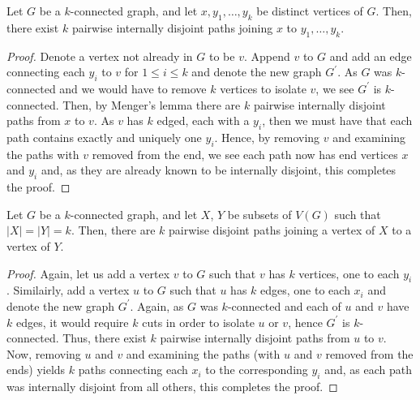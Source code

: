 \begin{lemma}
	Let $G$ be a $k$-connected graph, and let $x, y_1, \ldots, y_{k}$ be distinct vertices of $G$. Then, there exist $k$ pairwise internally disjoint paths joining $x$ to $y_1, \ldots, y_{k}$.
\end{lemma}
\begin{proof}
	Denote a vertex not already in $G$ to be $v$. Append  $v$ to $G$ and add an edge connecting each $ y_{i}$ to $v$ for $1 \le i \le k$ and denote the new graph $ G^{\prime}$. As $G$ was $k$-connected and we would have to remove $k$ vertices to isolate $v$, we see $G^{\prime}$ is $k$-connected. Then, by Menger's lemma there are $k$ pairwise internally disjoint paths from $x$ to $v$. As $v$ has $k$ edged, each with a $ y_{i}$, then we must have that each path contains exactly and uniquely one $ y_{i}$. Hence, by removing $v$ and examining the paths with $v$ removed from the end, we see each path now has end vertices $x$ and $ y_{i}$ and, as they are already known to be internally disjoint, this completes the proof.
\end{proof}
\begin{lemma}
	Let $G$ be a $k$-connected graph, and let $X$, $Y$ be subsets of $V\left( G \right) $ such that $\left| X \right| = \left| Y \right| = k$. Then, there are $k$ pairwise disjoint paths joining a vertex of $X$ to a vertex of $Y$.
\end{lemma}
\begin{proof}
	Again, let us add a vertex $v$ to $G$ such that $v$ has $k$ vertices, one to each $ y_{i}$. Similairly, add a vertex $u$ to $G$ such that $u$ has $k$ edges, one to each $x_{i}$ and denote the new graph $G^{\prime}$. Again, as $G$ was $k$-connected and each of $u$ and $v$ have $k$ edges, it would require $k$ cuts in order to isolate $u$ or $v$, hence $G^{\prime}$ is $k$-connected. Thus, there exist $k$ pairwise internally disjoint paths from $u$ to $v$. Now, removing $u$ and $v$ and examining the paths (with $u$ and $v$ removed from the ends) yields $k$ paths connecting each $x_{i}$ to the corresponding $y_{i}$ and, as each path was internally disjoint from all others, this completes the proof.
\end{proof}

